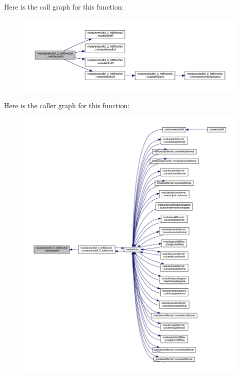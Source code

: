 Here is the call graph for this function\+:\nopagebreak
\begin{figure}[H]
\begin{center}
\leavevmode
\includegraphics[width=350pt]{namespacemodulenetcdfcf__2__hdf5mohid_ae5e557cc9dcf221c2e0d2768df186417_cgraph}
\end{center}
\end{figure}
Here is the caller graph for this function\+:\nopagebreak
\begin{figure}[H]
\begin{center}
\leavevmode
\includegraphics[width=350pt]{namespacemodulenetcdfcf__2__hdf5mohid_ae5e557cc9dcf221c2e0d2768df186417_icgraph}
\end{center}
\end{figure}
\mbox{\label{namespacemodulenetcdfcf__2__hdf5mohid_ae8ddd77f8739702fc89a6ced3c6794bc}} 
